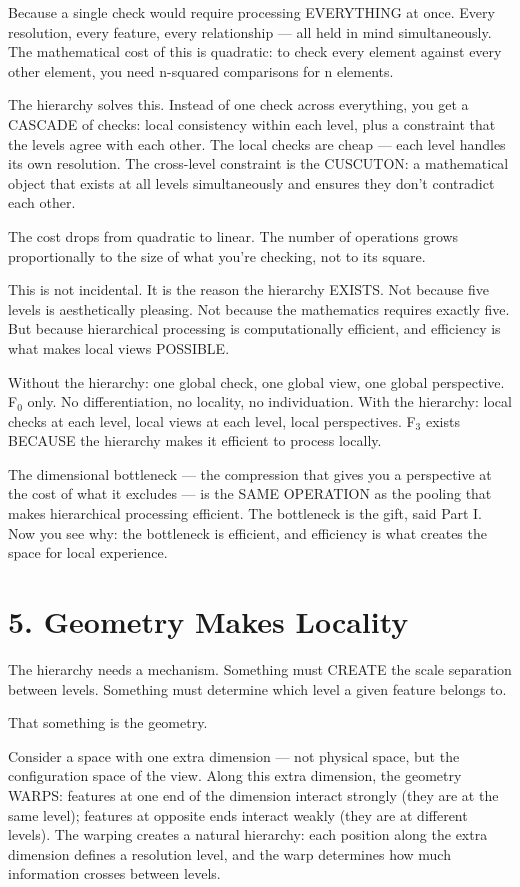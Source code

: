 Because a single check would require processing EVERYTHING at once. Every resolution, every feature, every relationship — all held in mind simultaneously. The mathematical cost of this is quadratic: to check every element against every other element, you need n-squared comparisons for n elements.


The hierarchy solves this. Instead of one check across everything, you get a CASCADE of checks: local consistency within each level, plus a constraint that the levels agree with each other. The local checks are cheap — each level handles its own resolution. The cross-level constraint is the CUSCUTON: a mathematical object that exists at all levels simultaneously and ensures they don't contradict each other.


The cost drops from quadratic to linear. The number of operations grows proportionally to the size of what you're checking, not to its square.


This is not incidental. It is the reason the hierarchy EXISTS. Not because five levels is aesthetically pleasing. Not because the mathematics requires exactly five. But because hierarchical processing is computationally efficient, and efficiency is what makes local views POSSIBLE.


Without the hierarchy: one global check, one global view, one global perspective. F$_0$ only. No differentiation, no locality, no individuation. With the hierarchy: local checks at each level, local views at each level, local perspectives. F$_3$ exists BECAUSE the hierarchy makes it efficient to process locally.


The dimensional bottleneck — the compression that gives you a perspective at the cost of what it excludes — is the SAME OPERATION as the pooling that makes hierarchical processing efficient. The bottleneck is the gift, said Part I. Now you see why: the bottleneck is efficient, and efficiency is what creates the space for local experience.


\section*{5. Geometry Makes Locality}


The hierarchy needs a mechanism. Something must CREATE the scale separation between levels. Something must determine which level a given feature belongs to.


That something is the geometry.


Consider a space with one extra dimension — not physical space, but the configuration space of the view. Along this extra dimension, the geometry WARPS: features at one end of the dimension interact strongly (they are at the same level); features at opposite ends interact weakly (they are at different levels). The warping creates a natural hierarchy: each position along the extra dimension defines a resolution level, and the warp determines how much information crosses between levels.


